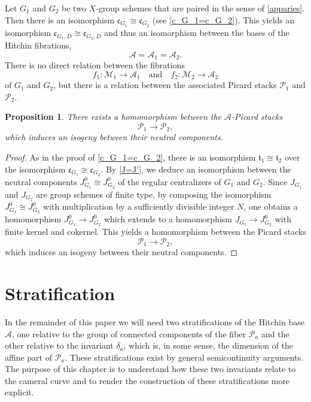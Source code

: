 \documentclass[12pt,english]{smfart}
\numberwithin{equation}{subsection}
\newtheorem{proposition}[equation]{Proposition}
\theoremstyle{remark}
\begin{document}
Let $G_1$ and $G_2$ be two $X$-group schemes that are paired in the sense of \ref{apparies}.
Then there is an isomorphism $\mathfrak{c}_{G_1}\cong \mathfrak{c}_{G_2}$ (see \ref{c_G_1=c_G_2}).
This yields an isomorphism $\mathfrak{c}_{G_1,D}\cong \mathfrak{c}_{G_2,D}$ and thus an isomorphism between the bases of the Hitchin fibrations,
$$
\mathcal{A}=\mathcal{A}_1=\mathcal{A}_2.
$$
There is no direct relation between the fibrations
$$
f_1:\mathcal{M}_1\rightarrow \mathcal{A}_1 \quad\text{and}\quad f_2:\mathcal{M}_2\rightarrow \mathcal{A}_2
$$
of $G_1$ and $G_2$, but there is a relation between the associated Picard stacks $\mathcal{P}_1$ and $\mathcal{P}_2$.

\begin{proposition}\label{isogenie P1 P2}
There exists a homomorphism between the $\mathcal{A}$-Picard stacks
$$
\mathcal{P}_1\rightarrow \mathcal{P}_2,
$$
which induces an isogeny between their neutral components.
\end{proposition}

\begin{proof}
As in the proof of \ref{c_G_1=c_G_2}, there is an isomorphism $\mathfrak{t}_1\cong \mathfrak{t}_2$
over the isomorphism $\mathfrak{c}_{G_1}\cong \mathfrak{c}_{G_2}$. By \ref{J=J'}, we deduce an isomorphism
between the neutral components $J_{G_1}^0\cong J_{G_2}^0$ of the regular centralizers of $G_1$ and $G_2$.
Since $J_{G_1}$ and $J_{G_2}$ are group schemes of finite type, by composing the isomorphism $J_{G_1}^0\cong J_{G_2}^0$
with multiplication by a sufficiently divisible integer $N$, one obtains a homomorphism $J_{G_1}^0\rightarrow J_{G_2}^0$ which extends to
a homomorphism $J_{G_1}\rightarrow J_{G_2}^0$ with finite kernel and cokernel. This yields a homomorphism between the Picard stacks
$$
\mathcal{P}_1\rightarrow \mathcal{P}_2,
$$
which induces an isogeny between their neutral components.
\end{proof}

\section{Stratification}
\label{section : stratification}

In the remainder of this paper we will need two stratifications of the Hitchin base $\mathcal{A}$, one relative to the group of connected components of the fiber $\mathcal{P}_a$ and the other relative to the invariant $\delta_a$, which is, in some sense, the dimension of the affine part of $\mathcal{P}_a$. These stratifications exist by general semicontinuity arguments. The purpose of this chapter is to understand how these two invariants relate to the cameral curve and to render the construction of these stratifications more explicit.
\end{document}
